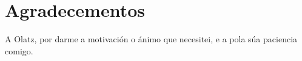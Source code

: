\pagestyle{plain}
\chapter*{Agradecementos}
A Olatz, por darme a motivación o ánimo que necesitei, e a pola súa paciencia comigo.